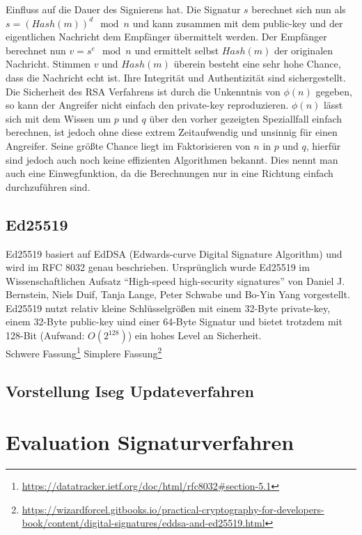 \documentclass[thesis=bachelor,faculty=cb]{hsmw-thesis}
\begin{document}
Einfluss auf die Dauer des Signierens hat. Die Signatur $s$ berechnet sich nun als $s = (Hash(m))^{d} \mod n$ und kann zusammen mit dem public-key und der eigentlichen Nachricht dem Empfänger übermittelt werden. Der Empfänger berechnet nun $v = s^{e} \mod n$ und ermittelt selbst $Hash(m)$ der
originalen Nachricht. Stimmen $v$ und $Hash(m)$ überein besteht eine sehr hohe Chance, dass die Nachricht echt ist. Ihre Integrität und Authentizität sind sichergestellt. Die Sicherheit des RSA Verfahrens ist durch die Unkenntnis von $\phi(n)$ gegeben, so kann der Angreifer nicht einfach
den private-key reproduzieren. $\phi(n)$ lässt sich mit dem Wissen um  $p$ und $q$ über den vorher gezeigten Speziallfall einfach berechnen, ist jedoch ohne diese extrem Zeitaufwendig und unsinnig für einen Angreifer. Seine größte Chance liegt im Faktorisieren von $n$ in $p$ und $q$, hierfür sind jedoch auch
noch keine effizienten Algorithmen bekannt. Dies nennt man auch eine Einwegfunktion, da die Berechnungen nur in eine Richtung einfach durchzuführen sind. 
\section{Ed25519}
Ed25519 basiert auf EdDSA (Edwards-curve Digital Signature Algorithm) und wird im RFC 8032\cite{ed25519} genau beschrieben. Ursprünglich wurde Ed25519 im Wissenschaftlichen Aufsatz \enquote{High-speed high-security signatures} \cite{ed25519_paper} von   Daniel J. Bernstein, Niels Duif, Tanja Lange, Peter Schwabe und Bo-Yin Yang vorgestellt.
\\[1cm]
Ed25519 nutzt relativ kleine Schlüsselgrößen mit einem 32-Byte private-key, einem 32-Byte public-key uind einer 64-Byte Signatur und bietet trotzdem mit 128-Bit (Aufwand: \begin{math}O(2^{128})\end{math}) ein hohes Level an Sicherheit.
\\[1cm]
Schwere Fassung\footnote{\url{https://datatracker.ietf.org/doc/html/rfc8032\#section-5.1}}
Simplere Fassung\footnote{\url{https://wizardforcel.gitbooks.io/practical-cryptography-for-developers-book/content/digital-signatures/eddsa-and-ed25519.html}}
\newpage
\section{Vorstellung Iseg Updateverfahren}
\chapter{Evaluation Signaturverfahren}
\end{document}

